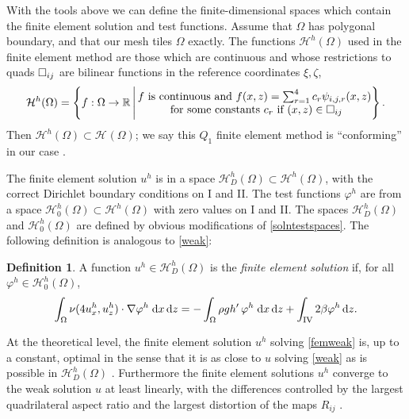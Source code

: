 \documentclass[11pt,final,reqno]{amsart}
\theoremstyle{remark}
\theoremstyle{definition}
\newtheorem*{defn}{Definition}
\newcommand{\RR}{\mathbb{R}}
\newcommand{\HoneX}[1]{\mathcal{H}_{#1}(\Omega)}
\begin{document}
\newcommand{\HhX}[1]{\mathcal{H}^h_{#1}(\Omega)}
\newcommand{\Hh}{\HhX{}}
\newcommand{\HhD}{\HhX{D}}
\newcommand{\Hhzero}{\HhX{0}}

With the tools above we can define the finite-dimensional spaces which contain the finite element solution and test functions.  Assume that $\Omega$ has polygonal boundary, and that our mesh tiles $\Omega$ exactly.  The functions $\HhX{}$ used in the finite element method are those which are continuous and whose restrictions to quads $\square_{ij}$ are bilinear functions in the reference coordinates $\xi,\zeta$,
	$$\HhX{} = \left\{f:\Omega \to \RR \,\Bigg|\, 
	     \begin{matrix}
	         f \text{ is continuous and } f(x,z) = \sum_{r=1}^4 c_r \psi_{i,j,r}(x,z) \\
	         \text{ for some constants } c_r \text{ if } (x,z)\in \quadij
	     \end{matrix}\right\}.$$
Then $\Hh \subset \HoneX{}$; we say this $Q_1$ finite element method is ``conforming'' in our case \cite{Elmanetal2005}.

The finite element solution $u^h$ is in a space $\HhD\subset \Hh$, with the correct Dirichlet boundary conditions on I and II.  The test functions $\varphi^h$ are from a space $\Hhzero\subset \Hh$ with zero values on I and II.  The spaces $\HhD$ and $\Hhzero$ are defined by obvious modifications of \eqref{solntestspaces}.  The following definition is analogous to \eqref{weak}:
\begin{defn}  A function $u^h\in\HhD$ is the \emph{finite element solution} if, for all $\varphi^h\in\Hhzero$,
\begin{equation}
\int_\Omega \nu (4 u^h_x, u^h_z) \cdot \nabla \varphi^h \;\mathrm{d}x\,\mathrm{d}z = - \int_\Omega \rho g h'\,\varphi^h \;\mathrm{d}x\,\mathrm{d}z + \int_{\mathrm{IV}} 2 \beta \varphi^h \,\mathrm{d}z. \label{femweak}
\end{equation}
\end{defn}

At the theoretical level, the finite element solution $u^h$ solving \eqref{femweak} is, up to a constant, optimal in the sense that it is as close to $u$ solving \eqref{weak} as is possible in $\HhD$ \cite[theorem 1.7]{Elmanetal2005}.  Furthermore the finite element solutions $u^h$ converge to the weak solution $u$ at least linearly, with the differences controlled by the largest quadrilateral aspect ratio and the largest distortion of the maps $R_{ij}$ \cite[definition 1.18, theorem 1.19, remark 1.20]{Elmanetal2005}.
\end{document}
